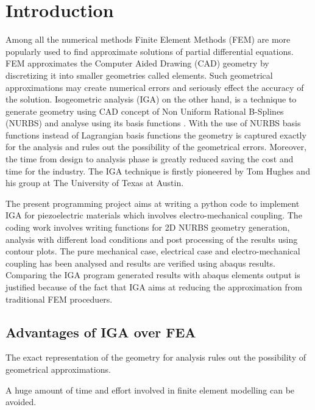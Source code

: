 \documentclass[11pt]{article}
\begin{document}
\section{Introduction}
Among all the numerical methods Finite Element Methods (FEM) are more popularly
used to find approximate solutions of partial differential equations. FEM
approximates the Computer Aided Drawing (CAD) geometry by discretizing it into
smaller geometries called elements. Such geometrical approximations may create
numerical errors and seriously effect the accuracy of the solution.
Isogeometric analysis (IGA) on the other hand, is a technique to generate geometry using CAD
concept of Non Uniform Rational B-Splines (NURBS) and analyse using its basis
functions \cite{agrawal2019iga}.
With the use of NURBS basis functions instead of Lagrangian basis functions the geometry is captured exactly for the analysis and rules out the possibility of the geometrical errors. Moreover, the time from design to analysis phase is greatly reduced saving the cost and time for the industry.
The IGA technique is firstly pioneered by Tom Hughes and his group at The
University of Texas at Austin.\\
\par
The present programming project aims at writing a python code to implement IGA for piezoelectric materials which involves electro-mechanical coupling. The coding work involves writing functions for 2D NURBS geometry generation, analysis with different load conditions and post processing of the results using contour plots. The pure mechanical case, electrical case and electro-mechanical coupling has been analysed and results are verified using abaqus results. Comparing the IGA program generated results with abaqus elements output is justified because of the fact that IGA aims at reducing the approximation from traditional FEM proceduers.      


\newpage


\subsection{Advantages of IGA over FEA}
\begin{description}[leftmargin=*]
	\item[$\bullet$]   The exact representation of the geometry for analysis rules
	out the possibility of geometrical approximations.
	\item[$\bullet$]   A huge amount of time and effort involved in finite element modelling
	can be avoided.
\end{description}
\end{document}
